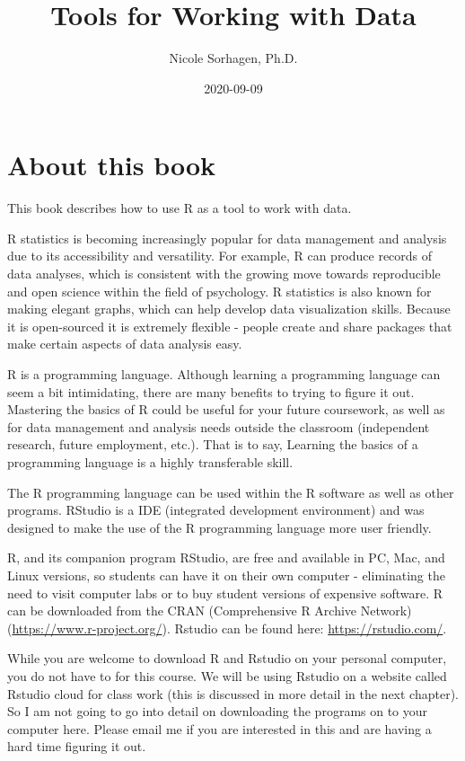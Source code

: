 \documentclass[
]{book}
\title{Tools for Working with Data}
\author{Nicole Sorhagen, Ph.D.}
\date{2020-09-09}
\begin{document}
\maketitle

{
\setcounter{tocdepth}{1}
\tableofcontents
}
\hypertarget{about-this-book}{%
\chapter{About this book}\label{about-this-book}}

This book describes how to use R as a tool to work with data.

R statistics is becoming increasingly popular for data management and analysis due to its accessibility and versatility. For example, R can produce records of data analyses, which is consistent with the growing move towards reproducible and open science within the field of psychology. R statistics is also known for making elegant graphs, which can help develop data visualization skills. Because it is open-sourced it is extremely flexible - people create and share packages that make certain aspects of data analysis easy.

R is a programming language. Although learning a programming language can seem a bit intimidating, there are many benefits to trying to figure it out. Mastering the basics of R could be useful for your future coursework, as well as for data management and analysis needs outside the classroom (independent research, future employment, etc.). That is to say, Learning the basics of a programming language is a highly transferable skill.

The R programming language can be used within the R software as well as other programs. RStudio is a IDE (integrated development environment) and was designed to make the use of the R programming language more user friendly.

R, and its companion program RStudio, are free and available in PC, Mac, and Linux versions, so students can have it on their own computer - eliminating the need to visit computer labs or to buy student versions of expensive software. R can be downloaded from the CRAN (Comprehensive R Archive Network) (\url{https://www.r-project.org/}). Rstudio can be found here: \url{https://rstudio.com/}.

While you are welcome to download R and Rstudio on your personal computer, you do not have to for this course. We will be using Rstudio on a website called Rstudio cloud for class work (this is discussed in more detail in the next chapter). So I am not going to go into detail on downloading the programs on to your computer here. Please email me if you are interested in this and are having a hard time figuring it out.
\end{document}
